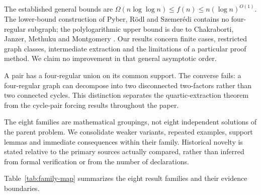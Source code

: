 \documentclass[smallextended]{svjour3}
\begin{document}
The established general bounds are
\(\Omega(n\log\log n)\leq f(n)\leq n(\log n)^{O(1)}\). The lower-bound
construction of Pyber, Rödl and Szemerédi contains no four-regular
subgraph; the polylogarithmic upper bound is due to Chakraborti, Janzer,
Methuku and Montgomery \cite{ref3,ref2}. Our results concern finite cases,
restricted graph classes, intermediate extraction and the limitations of
a particular proof method. We claim no improvement in that general
asymptotic order.

A pair has a four-regular union on its common support. The converse
fails: a four-regular graph can decompose into two disconnected
two-factors rather than two connected cycles. This distinction separates
the quartic-extraction theorem from the cycle-pair forcing results
throughout the paper.

The eight families are mathematical groupings, not eight independent
solutions of the parent problem. We consolidate weaker variants,
repeated examples, support lemmas and immediate consequences within
their family. Historical novelty is stated relative to the primary
sources actually compared, rather than inferred from formal verification
or from the number of declarations.

Table~\ref{tab:family-map} summarizes the eight result families and their evidence boundaries.
\end{document}
